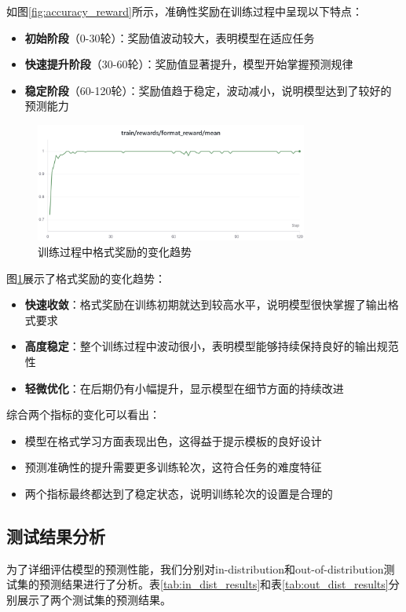 \documentclass[a4paper, 12pt]{article}
\begin{document}
如图\ref{fig:accuracy_reward}所示，准确性奖励在训练过程中呈现以下特点：
\begin{itemize}
    \item \textbf{初始阶段}（0-30轮）：奖励值波动较大，表明模型在适应任务
    \item \textbf{快速提升阶段}（30-60轮）：奖励值显著提升，模型开始掌握预测规律
    \item \textbf{稳定阶段}（60-120轮）：奖励值趋于稳定，波动减小，说明模型达到了较好的预测能力
\end{itemize}

\begin{figure}[htbp]
    \centering
    \includegraphics[width=0.8\textwidth]{Images/format_reward.png}
    \caption{训练过程中格式奖励的变化趋势}
    \label{fig:format_reward}
\end{figure}

图\ref{fig:format_reward}展示了格式奖励的变化趋势：
\begin{itemize}
    \item \textbf{快速收敛}：格式奖励在训练初期就达到较高水平，说明模型很快掌握了输出格式要求
    \item \textbf{高度稳定}：整个训练过程中波动很小，表明模型能够持续保持良好的输出规范性
    \item \textbf{轻微优化}：在后期仍有小幅提升，显示模型在细节方面的持续改进
\end{itemize}

综合两个指标的变化可以看出：
\begin{itemize}
    \item 模型在格式学习方面表现出色，这得益于提示模板的良好设计
    \item 预测准确性的提升需要更多训练轮次，这符合任务的难度特征
    \item 两个指标最终都达到了稳定状态，说明训练轮次的设置是合理的
\end{itemize}

\subsection{测试结果分析}
为了详细评估模型的预测性能，我们分别对in-distribution和out-of-distribution测试集的预测结果进行了分析。表\ref{tab:in_dist_results}和表\ref{tab:out_dist_results}分别展示了两个测试集的预测结果。
\end{document}
